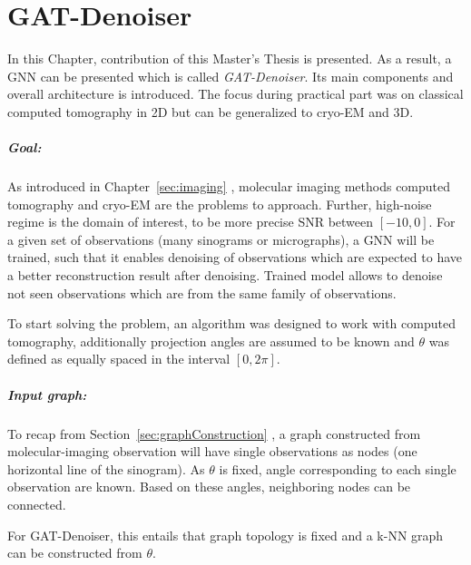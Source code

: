 \chapter{GAT-Denoiser}
\label{sec:contribution}

In this Chapter, contribution of this Master's Thesis is presented.
As a result, a GNN can be presented which is called \textit{GAT-Denoiser}.
Its main components and overall architecture is introduced.
The focus during practical part was on classical computed tomography in 2D but
can be generalized to cryo-EM and 3D.

\paragraph{Goal:}
As introduced in Chapter~\ref{sec:imaging} \textit{}, molecular imaging methods computed tomography and cryo-EM are the problems
to approach. Further, high-noise regime is the domain of interest, to be more precise SNR between $[-10, 0]$.
For a given set of observations (many sinograms or micrographs), a GNN will be trained, such that
it enables denoising of observations which are expected to have a better reconstruction result after denoising.
Trained model allows to denoise not seen observations which are from the same family of observations.


\begin{tcolorbox}[colback=red!5!white,colframe=red!75!black]
  To start solving the problem, an algorithm was designed to work with computed tomography, additionally
  projection angles are assumed to be known and $\theta$ was defined as equally spaced 
  in the interval $[0, 2 \pi]$. 
\end{tcolorbox}

\paragraph{Input graph:}
To recap from Section~\ref{sec:graphConstruction}  \textit{}, 
a graph constructed from molecular-imaging observation will have single observations as nodes (one horizontal line of the sinogram). 
As $\theta$ is fixed, angle corresponding to each single observation are known. 
Based on these angles, neighboring nodes can be connected.

\begin{tcolorbox}[colback=red!5!white,colframe=red!75!black]
  For GAT-Denoiser, this entails that graph topology is fixed and
  a k-NN graph can be constructed from $\theta$.
\end{tcolorbox}


